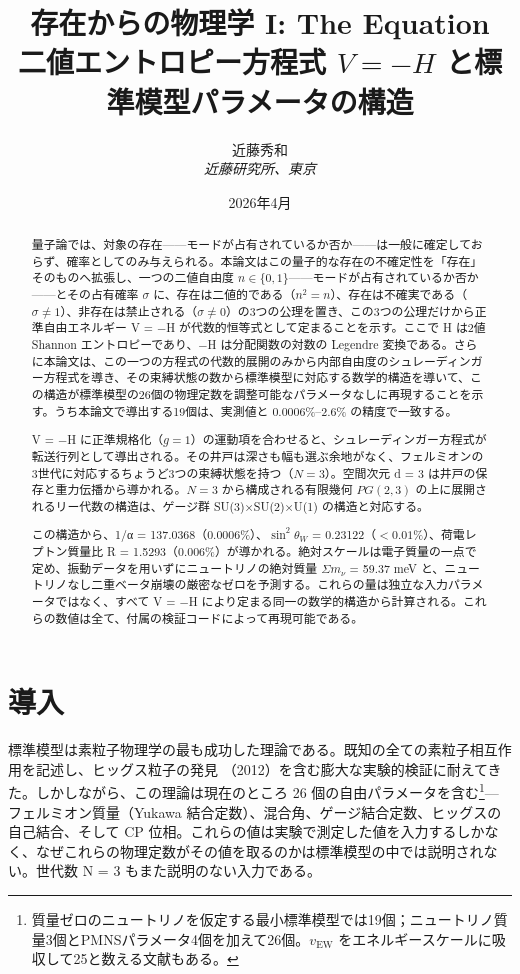 \documentclass[fontsize=11pt,paper=a4,lualatex]{jlreq}
\title{\textbf{存在からの物理学 I: The Equation}\\[0.45em]{\large 二値エントロピー方程式 $V = -H$ と標準模型パラメータの構造}}
\author{近藤秀和\\[0.5em]\small\textit{近藤研究所、東京}}
\date{2026年4月}
\begin{document}
\maketitle
\begin{abstract}\sloppy\noindent\label{ux6982ux8981}

量子論では、対象の存在——モードが占有されているか否か——は一般に確定しておらず、確率としてのみ与えられる。本論文はこの量子的な存在の不確定性を「存在」そのものへ拡張し、一つの二値自由度 $n \in \{0,1\}$——モードが占有されているか否か——とその占有確率 $\sigma$ に、存在は二値的である（$n^2{=}n$）、存在は不確実である（$\sigma \neq 1$）、非存在は禁止される（$\sigma \neq 0$）の3つの公理を置き、この3つの公理だけから正準自由エネルギー V = −H が代数的恒等式として定まることを示す。ここで H は2値 Shannon エントロピーであり、−H は分配関数の対数の Legendre 変換である。さらに本論文は、この一つの方程式の代数的展開のみから内部自由度のシュレーディンガー方程式を導き、その束縛状態の数から標準模型に対応する数学的構造を導いて、この構造が標準模型の26個の物理定数を調整可能なパラメータなしに再現することを示す。うち本論文で導出する19個は、実測値と 0.0006\%--2.6\% の精度で一致する。

V = −H に正準規格化（$g = 1$）の運動項を合わせると、シュレーディンガー方程式が転送行列として導出される。その井戸は深さも幅も選ぶ余地がなく、フェルミオンの3世代に対応するちょうど3つの束縛状態を持つ（$N = 3$）。空間次元 d = 3 は井戸の保存と重力伝播から導かれる。$N = 3$ から構成される有限幾何 $PG(2,3)$ の上に展開されるリー代数の構造は、ゲージ群 SU(3)×SU(2)×U(1) の構造と対応する。

この構造から、1/α = 137.0368（0.0006\%）、$\sin^2\!\theta_W$ = 0.23122（$<0.01$\%）、荷電レプトン質量比 R = 1.5293（0.006\%）が導かれる。絶対スケールは電子質量の一点で定め、振動データを用いずにニュートリノの絶対質量 $\Sigma m_\nu$ = 59.37 meV と、ニュートリノなし二重ベータ崩壊の厳密なゼロを予測する。これらの量は独立な入力パラメータではなく、すべて V = −H により定まる同一の数学的構造から計算される。これらの数値は全て、付属の検証コードによって再現可能である。

\end{abstract}

\section{導入}\label{ux5c0eux5165}

標準模型は素粒子物理学の最も成功した理論である。既知の全ての素粒子相互作用を記述し、ヒッグス粒子の発見 \cite{atlas,cms}（2012）を含む膨大な実験的検証に耐えてきた。しかしながら、この理論は現在のところ 26 個の自由パラメータを含む\footnote{質量ゼロのニュートリノを仮定する最小標準模型では19個；ニュートリノ質量3個とPMNSパラメータ4個を加えて26個。$v_\mathrm{EW}$ をエネルギースケールに吸収して25と数える文献もある。}---フェルミオン質量（Yukawa 結合定数）、混合角、ゲージ結合定数、ヒッグスの自己結合、そして CP 位相。これらの値は実験で測定した値を入力するしかなく、なぜこれらの物理定数がその値を取るのかは標準模型の中では説明されない。世代数 N = 3 もまた説明のない入力である。
\end{document}

